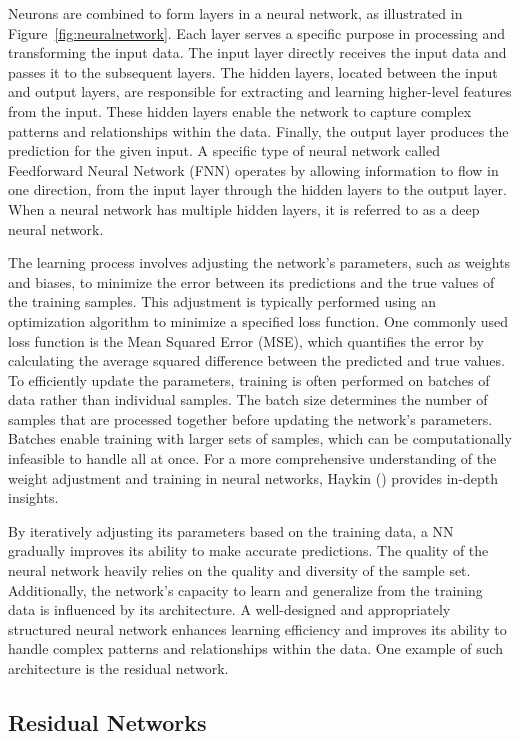 Neurons are combined to form layers in a neural network, as illustrated in Figure~\ref{fig:neuralnetwork}. Each layer serves a specific purpose in processing and transforming the input data. The input layer directly receives the input data and passes it to the subsequent layers. The hidden layers, located between the input and output layers, are responsible for extracting and learning higher-level features from the input. These hidden layers enable the network to capture complex patterns and relationships within the data. Finally, the output layer produces the prediction for the given input. A specific type of neural network called Feedforward Neural Network (FNN) operates by allowing information to flow in one direction, from the input layer through the hidden layers to the output layer. When a neural network has multiple hidden layers, it is referred to as a deep neural network.

The learning process involves adjusting the network's parameters, such as weights and biases, to minimize the error between its predictions and the true values of the training samples. This adjustment is typically performed using an optimization algorithm to minimize a specified loss function. One commonly used loss function is the Mean Squared Error (MSE), which quantifies the error by calculating the average squared difference between the predicted and true values. To efficiently update the parameters, training is often performed on batches of data rather than individual samples. The batch size determines the number of samples that are processed together before updating the network's parameters. Batches enable training with larger sets of samples, which can be computationally infeasible to handle all at once. For a more comprehensive understanding of the weight adjustment and training in neural networks, Haykin (\citeyear{Haykin/2009}) provides in-depth insights.

By iteratively adjusting its parameters based on the training data, a NN gradually improves its ability to make accurate predictions. The quality of the neural network heavily relies on the quality and diversity of the sample set. Additionally, the network's capacity to learn and generalize from the training data is influenced by its architecture. A well-designed and appropriately structured neural network enhances learning efficiency and improves its ability to handle complex patterns and relationships within the data. One example of such architecture is the residual network.

\subsection{Residual Networks}
\label{sec:background_resnets}

